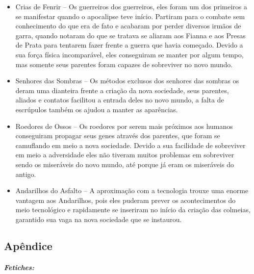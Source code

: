\begin{itemize}
    \item Crias de Fenrir – Os guerreiros dos guerreiros, eles foram um dos primeiros a se manifestar quando o apocalipse teve início. Partiram para o combate sem conhecimento do que era de fato e acabaram por perder diversos irmãos de garra, quando notaram do que se tratava se aliaram aos Fianna e aos Presas de Prata para tentarem fazer frente a guerra que havia começado. Devido a sua força física incomparável, eles conseguiram se manter por algum tempo, mas somente seus parentes foram capazes de sobreviver no novo mundo.
    \item Senhores das Sombras – Os métodos exclusos dos senhores das sombras os deram uma dianteira frente a criação da nova sociedade, seus parentes, aliados e contatos facilitou a entrada deles no novo mundo, a falta de escrúpulos também os ajudou a manter as aparências.
    \item Roedores de Ossos – Os roedores por serem mais próximos aos humanos conseguiram propagar seus genes através dos parentes, que foram se camuflando em meio a nova sociedade. Devido a sua facilidade de sobreviver em meio a adversidade eles não tiveram muitos problemas em sobreviver sendo os miseráveis do novo mundo, até porque já eram os miseráveis do antigo.
    \item Andarilhos do Asfalto – A aproximação com a tecnologia trouxe uma enorme vantagem aos Andarilhos, pois eles puderam prever os acontecimentos do meio tecnológico e rapidamente se inseriram no início da criação das colmeias, garantido sua vaga na nova sociedade que se instaurou.
\end{itemize}

\subsection{\bf Apêndice}
\subparagraph{\bf Fetiches:}

